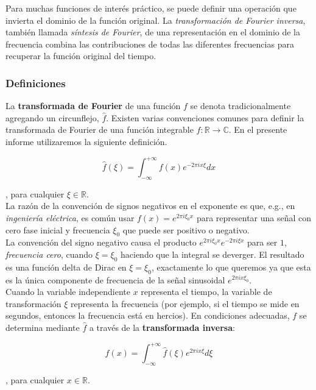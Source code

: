 \documentclass[osajnl,twocolumn,showpacs,superscriptaddress,10pt,floatfix]{revtex4-1} %
\begin{document}
Para muchas funciones de interés práctico, se puede definir una operación 
que invierta el dominio de la función original. La \textit{transformación de Fourier inversa},
también llamada \textit{síntesis de Fourier}, de una representación en el dominio de la frecuencia
combina las contribuciones de todas las diferentes frecuencias para recuperar la función original del tiempo.

\subsubsection{Definiciones}

La \textbf{transformada de Fourier} de una función $f$ se denota tradicionalmente agregando un circunflejo, $\hat{f}$. Existen varias
convenciones comunes para definir la transformada de Fourier de una función integrable $f : \mathbb{R} \rightarrow \mathbb{C}$.
En el presente informe utilizaremos la siguiente definición.

\[
    \hat{f}(\xi) = \int_{- \infty}^{+ \infty} f(x) e^{-2 \pi ix \xi} dx
\]

, para cualquier $\xi \in \mathbb{R}$. \\

La razón de la convención de signos negativos en el exponente es que, e.g., en \textit{ingeniería eléctrica}, 
es común usar $f(x) = e^{2 \pi i \xi_{0} x}$ para representar una señal con cero fase inicial y 
frecuencia $\xi_{0}$ que puede ser positivo o negativo. \\

La convención del signo negativo causa el producto $e^{2 \pi i \xi_{0} x} e^{-2 \pi i \xi x}$ para 
ser $1$, \textit{frecuencia cero}, cuando $\xi = \xi_{0}$ haciendo que la integral se deverger. 
El resultado es una función delta de Dirac en $\xi = \xi_{0}$,  exactamente lo que queremos ya que esta es 
la única componente de frecuencia de la señal sinusoidal $e^{2 \pi ix \xi_{0}}$. \\

Cuando la variable independiente $x$ representa el tiempo, la variable de transformación $\xi$ representa la frecuencia
(por ejemplo, si el tiempo se mide en segundos, entonces la frecuencia está en hercios). En condiciones adecuadas, 
$f$ se determina mediante $\hat{f}$ a través de la \textbf{transformada inversa}:

\[
    f(x) = \int_{- \infty}^{+ \infty} \hat{f}(\xi) e^{2 \pi ix \xi} d \xi
\]

, para cualquier $x \in \mathbb{R}$.
\end{document}
